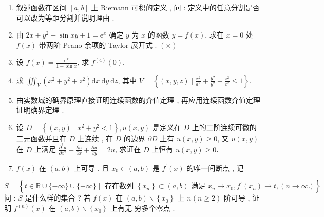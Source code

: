 \documentclass[10pt]{article}
\begin{document}
\begin{enumerate}
  \item  叙述函数在区间  $[a, b]$  上  Riemann  可积的定义 ,  问 :  定义中的任意分割是否可以改为等距分割并说明理由 .

  \item  由  $2 x+y^{2}+\sin x y+1=\mathrm{e}^{x}$  确定  $y$  为  $x$  的函数  $y=f(x)$,  求在  $x=0$  处  $f(x)$  带两阶  Peano  余项的  Taylor  展开式 . $(\times)$

  \item  设  $f(x)=\frac{\mathrm{e}^{x}}{1-\sin x}$,  求  $f^{(4)}(0)$.

  \item  求  $\iiint_{V}\left(x^{2}+y^{2}+z^{2}\right) \mathrm{d} x \mathrm{~d} y \mathrm{~d} z$,  其中  $V=\left\{(x, y, z) \mid \frac{x^{2}}{a^{2}}+\frac{y^{2}}{b^{2}}+\frac{z^{2}}{c^{2}} \leqslant 1\right\}$.

  \item  由实数域的确界原理直接证明连续函数的介值定理 ,  再应用连续函数介值定理证明确界定理 .

  \item  设  $D=\left\{(x, y) \mid x^{2}+y^{2}<1\right\}, u(x, y)$  是定义在  $D$  上的二阶连续可微的二元函数并且在  $\bar{D}$  上连续 ,  在  $D$  的边界  $\partial D$  上有  $u(x, y) \geqslant 0$,  又  $u(x, y)$  在  $D$  上满足  $\frac{\partial^{2} u}{\partial x^{2}}+\frac{\partial u}{\partial x}+\frac{\partial u}{\partial y}=2 u$,  求证在  $D$  上恒有  $u(x, y) \geqslant 0$.

  \item $f(x)$  在  $(a, b)$  上可导 ,  且  $x_{0} \in(a, b)$  是  $f^{\prime}(x)$  的唯一间断点 ,  记 

\end{enumerate}
$$
S=\left\{t \in \mathbb{R} \cup\{-\infty\} \cup\{+\infty\} \mid \text { 存在数列 }\left\{x_{n}\right\} \subset(a, b) \text { 满足 } x_{n} \rightarrow x_{0}, f^{\prime}\left(x_{n}\right) \rightarrow t,(n \rightarrow \infty)\right\} .
$$
 问 : $S$  是什么样的集合 ?  若  $f(x)$  在  $(a, b) \backslash\left\{x_{0}\right\}$  上  $n(n \geqslant 2)$  阶可导 ,  证明  $f^{(n)}(x)$  在  $(a, b) \backslash\left\{x_{0}\right\}$  上有无   穷多个零点 .
\end{document}
